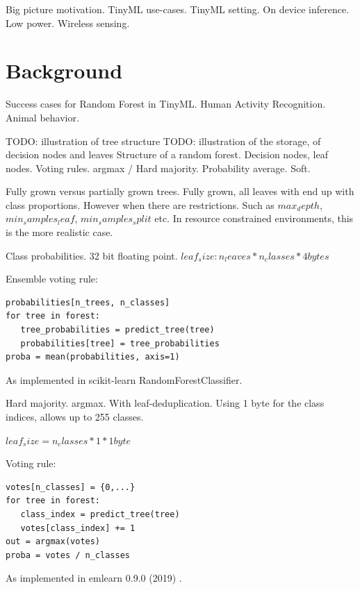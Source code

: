 \documentclass{article}
\begin{document}
Big picture motivation.
TinyML use-cases.
TinyML setting. On device inference. Low power. Wireless sensing.

\noindent

\newpage
\section{Background}

\cite{random_forest_breiman2001}

Success cases for Random Forest in TinyML.
Human Activity Recognition. \cite{elsts_are_2021}
Animal behavior. \cite{tatler_high_2018} \cite{kleanthous_feature_2020} \cite{tran_iot-based_2022}


TODO: illustration of tree structure
TODO: illustration of the storage, of decision nodes and leaves
Structure of a random forest.
Decision nodes, leaf nodes.
Voting rules. argmax / Hard majority.
Probability average. Soft.

Fully grown versus partially grown trees.
Fully grown, all leaves with end up with class proportions.
However when there are restrictions. Such as $max_depth$, $min_samples_leaf$, $min_samples_split$ etc.
In resource constrained environments, this is the more realistic case.


Class probabilities. 32 bit floating point.
$leaf_size: n_leaves * n_classes * 4 bytes$

Ensemble voting rule:
\begin{verbatim}
probabilities[n_trees, n_classes]
for tree in forest:
   tree_probabilities = predict_tree(tree)
   probabilities[tree] = tree_probabilities
proba = mean(probabilities, axis=1)
\end{verbatim}

As implemented in scikit-learn \cite{scikit-learn} RandomForestClassifier.

Hard majority. argmax. With leaf-deduplication.
Using 1 byte for the class indices, allows up to 255 classes.

$leaf_size = n_classes * 1 * 1 byte$

Voting rule:
\begin{verbatim}
votes[n_classes] = {0,...}
for tree in forest:
   class_index = predict_tree(tree)
   votes[class_index] += 1
out = argmax(votes)
proba = votes / n_classes
\end{verbatim}

As implemented in emlearn 0.9.0 (2019) \cite{emlearn}.
\end{document}
